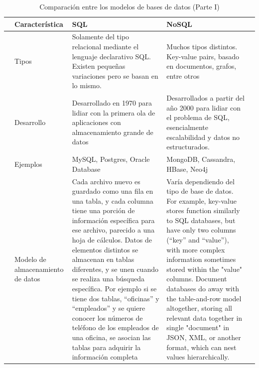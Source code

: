 \begin{table}[H]\centering
	
	\caption{Comparación entre los modelos de bases de datos (Parte I)}
	\label{basesDeDatos1}
	
	\begin{tabular}{@{}cC{3cm}C{5cm}C{5cm}c@{}}\toprule
		
		& Característica & SQL & NoSQL &\\ \midrule
		
		& Tipos & Solamente del tipo relacional mediante el lenguaje declarativo SQL. Existen pequeñas variaciones pero se basan en lo mismo. & Muchos tipos distintos. Key-value pairs, basado en documentos, grafos, entre otros &\\ \hline
		
		& Desarrollo & Desarrollado en 1970 para lidiar con la primera ola de aplicaciones con almacenamiento grande de datos & Desarrollados a partir del año 2000 para lidiar con el problema de SQL, esencialmente escalabilidad y datos no estructurados. &\\ \hline
		
		& Ejemplos & MySQL, Postgres, Oracle Database & MongoDB, Cassandra, HBase, Neo4j &\\ \hline
		
		& Modelo de almacenamiento de datos &  Cada archivo nuevo es guardado como una fila en una tabla, y cada columna tiene una porción de información específica para ese archivo, parecido a una hoja de cálculos. Datos de elementos distintos se almacenan en tablas diferentes, y se unen cuando se realiza una búsqueda específica. Por ejemplo si se tiene dos tablas, ``oficinas'' y ``empleados'' y se quiere conocer los números de teléfono de los empleados de una oficina, se asocian las tablas  para adquirir la información completa & Varía dependiendo del tipo de base de datos. For example, key-value stores function similarly to SQL databases, but have only two columns (``key'' and ``value''), with more complex information sometimes stored within the "value" columns. Document databases do away with the table-and-row model altogether, storing all relevant data together in single "document" in JSON, XML, or another format, which can nest values hierarchically. & \\ 
		
		\bottomrule
		
	\end{tabular}
	
\end{table}



